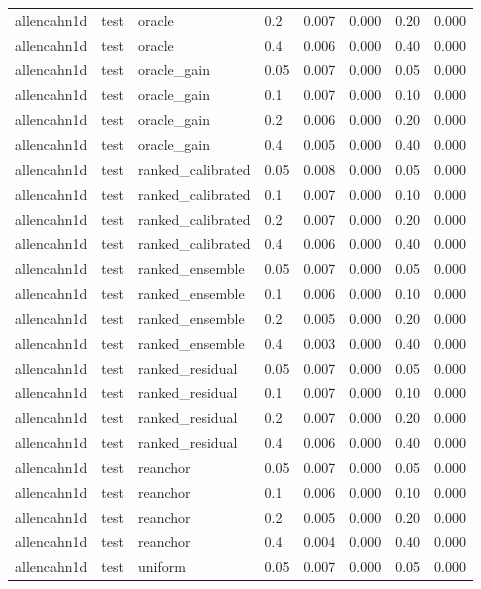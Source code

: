\begin{longtable}{llllrrrr}
allencahn1d & test & oracle & 0.2 & 0.007 & 0.000 & 0.20 & 0.000 \\
allencahn1d & test & oracle & 0.4 & 0.006 & 0.000 & 0.40 & 0.000 \\
allencahn1d & test & oracle\_gain & 0.05 & 0.007 & 0.000 & 0.05 & 0.000 \\
allencahn1d & test & oracle\_gain & 0.1 & 0.007 & 0.000 & 0.10 & 0.000 \\
allencahn1d & test & oracle\_gain & 0.2 & 0.006 & 0.000 & 0.20 & 0.000 \\
allencahn1d & test & oracle\_gain & 0.4 & 0.005 & 0.000 & 0.40 & 0.000 \\
allencahn1d & test & ranked\_calibrated & 0.05 & 0.008 & 0.000 & 0.05 & 0.000 \\
allencahn1d & test & ranked\_calibrated & 0.1 & 0.007 & 0.000 & 0.10 & 0.000 \\
allencahn1d & test & ranked\_calibrated & 0.2 & 0.007 & 0.000 & 0.20 & 0.000 \\
allencahn1d & test & ranked\_calibrated & 0.4 & 0.006 & 0.000 & 0.40 & 0.000 \\
allencahn1d & test & ranked\_ensemble & 0.05 & 0.007 & 0.000 & 0.05 & 0.000 \\
allencahn1d & test & ranked\_ensemble & 0.1 & 0.006 & 0.000 & 0.10 & 0.000 \\
allencahn1d & test & ranked\_ensemble & 0.2 & 0.005 & 0.000 & 0.20 & 0.000 \\
allencahn1d & test & ranked\_ensemble & 0.4 & 0.003 & 0.000 & 0.40 & 0.000 \\
allencahn1d & test & ranked\_residual & 0.05 & 0.007 & 0.000 & 0.05 & 0.000 \\
allencahn1d & test & ranked\_residual & 0.1 & 0.007 & 0.000 & 0.10 & 0.000 \\
allencahn1d & test & ranked\_residual & 0.2 & 0.007 & 0.000 & 0.20 & 0.000 \\
allencahn1d & test & ranked\_residual & 0.4 & 0.006 & 0.000 & 0.40 & 0.000 \\
allencahn1d & test & reanchor & 0.05 & 0.007 & 0.000 & 0.05 & 0.000 \\
allencahn1d & test & reanchor & 0.1 & 0.006 & 0.000 & 0.10 & 0.000 \\
allencahn1d & test & reanchor & 0.2 & 0.005 & 0.000 & 0.20 & 0.000 \\
allencahn1d & test & reanchor & 0.4 & 0.004 & 0.000 & 0.40 & 0.000 \\
allencahn1d & test & uniform & 0.05 & 0.007 & 0.000 & 0.05 & 0.000 \\

\end{longtable}
